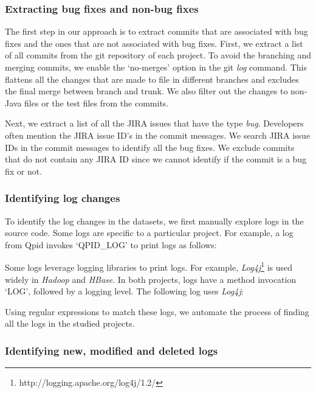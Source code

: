 \subsubsection{Extracting bug fixes and non-bug fixes}

The first step in our approach is to extract commits that are associated with bug fixes and the ones that are not associated with bug fixes. First, we extract a list of all commits from the git repository of each project. To avoid the branching and merging commits, we enable the `no-merges' option in the git \textsl{log} command. This flattens all the changes that are made to file in different branches and excludes the final merge between branch and trunk. We also filter out the changes to non-Java files or the test files from the commits. 

Next, we extract a list of all the JIRA issues that have the type \emph{bug}. Developers often mention the JIRA issue ID's in the commit messages. We search JIRA issue IDs in the commit messages to identify all the bug fixes. We exclude commits that do not contain any JIRA ID since we cannot identify if the commit is a bug fix or not. 

\subsubsection{Identifying log changes}

To identify the log changes in the datasets, we first manually explore logs in the source code. Some logs are specific to a particular project. For example, a log from Qpid invokes `QPID\_LOG' to print logs as follows: 

Some logs leverage logging libraries to print logs. For example, \textsl{Log4j}\footnote{http://logging.apache.org/log4j/1.2/} is used widely in \emph{Hadoop} and \emph{HBase}. In both projects, logs have a method invocation `LOG', followed by a logging level. The following log uses \textsl{Log4j}:

Using regular expressions to match these logs, we automate the process of finding all the logs in the studied projects.


\subsubsection{Identifying new, modified and deleted logs}

